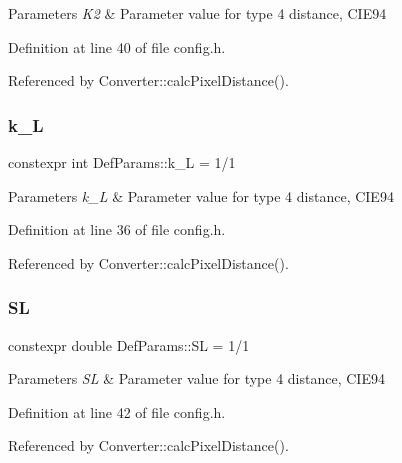 \begin{DoxyParams}{Parameters}
{\em K2} & Parameter value for type 4 distance, C\+I\+E94 \\
\hline
\end{DoxyParams}


Definition at line 40 of file config.\+h.



Referenced by Converter\+::calc\+Pixel\+Distance().

\mbox{\label{namespace_def_params_a6e01701980f316db62c9b09a8f4a033d}} 
\subsubsection{\texorpdfstring{k\_L}{k\_L}}
{\footnotesize\ttfamily constexpr int Def\+Params\+::k\+\_\+L = 1/1}


\begin{DoxyParams}{Parameters}
{\em k\+\_\+L} & Parameter value for type 4 distance, C\+I\+E94 \\
\hline
\end{DoxyParams}


Definition at line 36 of file config.\+h.



Referenced by Converter\+::calc\+Pixel\+Distance().

\mbox{\label{namespace_def_params_af164df797c0355e3137b26b6cdae35a3}} 
\subsubsection{\texorpdfstring{SL}{SL}}
{\footnotesize\ttfamily constexpr double Def\+Params\+::\+SL = 1/1}


\begin{DoxyParams}{Parameters}
{\em SL} & Parameter value for type 4 distance, C\+I\+E94 \\
\hline
\end{DoxyParams}


Definition at line 42 of file config.\+h.



Referenced by Converter\+::calc\+Pixel\+Distance().

